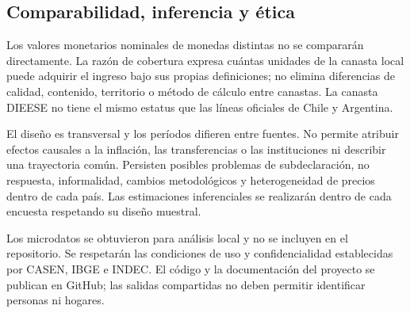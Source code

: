 \subsection{Comparabilidad, inferencia y ética}
Los valores monetarios nominales de monedas distintas no se compararán directamente. La razón de cobertura expresa cuántas unidades de la canasta local puede adquirir el ingreso bajo sus propias definiciones; no elimina diferencias de calidad, contenido, territorio o método de cálculo entre canastas. La canasta DIEESE no tiene el mismo estatus que las líneas oficiales de Chile y Argentina.

El diseño es transversal y los períodos difieren entre fuentes. No permite atribuir efectos causales a la inflación, las transferencias o las instituciones ni describir una trayectoria común. Persisten posibles problemas de subdeclaración, no respuesta, informalidad, cambios metodológicos y heterogeneidad de precios dentro de cada país. Las estimaciones inferenciales se realizarán dentro de cada encuesta respetando su diseño muestral.

Los microdatos se obtuvieron para análisis local y no se incluyen en el repositorio. Se respetarán las condiciones de uso y confidencialidad establecidas por CASEN, IBGE e INDEC. El código y la documentación del proyecto se publican en GitHub; las salidas compartidas no deben permitir identificar personas ni hogares.